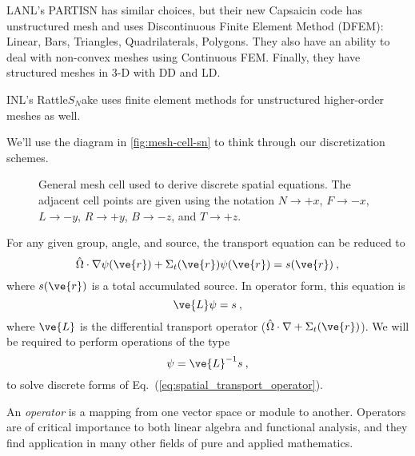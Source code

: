 \documentclass[12pt]{article}
\newcommand{\vOmega}{\ensuremath{\hat{\Omega}}}
\begin{document}
LANL's PARTISN has similar choices, but their new Capsaicin code has unstructured mesh and uses Discontinuous Finite Element Method (DFEM): Linear, Bars, Triangles, Quadrilaterals, Polygons. They also have an ability to deal with non-convex meshes using Continuous FEM. Finally, they have structured meshes in 3-D with DD and LD.

INL's Rattle$S_N$ake uses finite element methods for unstructured higher-order
meshes as well.

We'll use the diagram in \autoref{fig:mesh-cell-sn} to think through our discretization schemes.
\begin{figure}[h!]
  \begin{center}
    
  \end{center}
  \caption{General mesh cell used to derive discrete spatial
    equations.  The adjacent cell points are given using the notation
    $N\rightarrow +x$, $F\rightarrow -x$, $L\rightarrow -y$, $R\rightarrow
    +y$, $B\rightarrow -z$, and $T\rightarrow +z$.}
  \label{fig:mesh-cell-sn}
\end{figure}

For any given group, angle, and source, the transport equation can be reduced to
\begin{equation}
  \vOmega\cdot\nabla\psi(\ve{r}) + \Sigma_t(\ve{r})\psi(\ve{r}) =
  s(\ve{r})\:,
  \label{eq:spatial_transport}
\end{equation}
where $s(\ve{r})$ is a total accumulated source.  In operator form, this
equation is
\begin{equation}
  \ve{L}\psi = s\:,
  \label{eq:spatial_transport_operator}
\end{equation}
where $\ve{L}$ is the differential transport operator ($\vOmega\cdot\nabla + \Sigma_t(\ve{r})$).  We will be required to perform operations of the type
\begin{equation}
  \psi = \ve{L}^{-1}s\:,
\end{equation}
to solve discrete forms of Eq.~(\ref{eq:spatial_transport_operator}).  

An \textit{operator} is a mapping from one vector space or module to another. Operators are of critical importance to both linear algebra and functional analysis, and they find application in many other fields of pure and applied mathematics.
\end{document}
